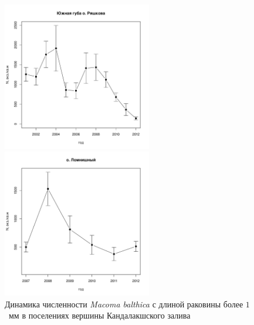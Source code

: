 \documentclass[12pt, a4paper]{article}
\begin{document}
\begin{figure}[h]
\begin{minipage}[b]{.46\linewidth}
\begin{center}
\includegraphics[width=65mm]{../White_Sea/Ryashkov_YuG/N2_dynamic.pdf}
\end{center}
\end{minipage}
%
\hfil %
%
\begin{minipage}[b]{.46\linewidth}
\begin{center}
\includegraphics[width=65mm]{../White_Sea/Lomnishniy/N2_dynamic.pdf}
\end{center}
\end{minipage}



\caption{Динамика численности {\it Macoma balthica} с длиной раковины более $1$~мм в поселениях вершины Кандалакшского залива}
\label{ris:dynamic_Kandalaksha_all2}
\end{figure}
\end{document}
